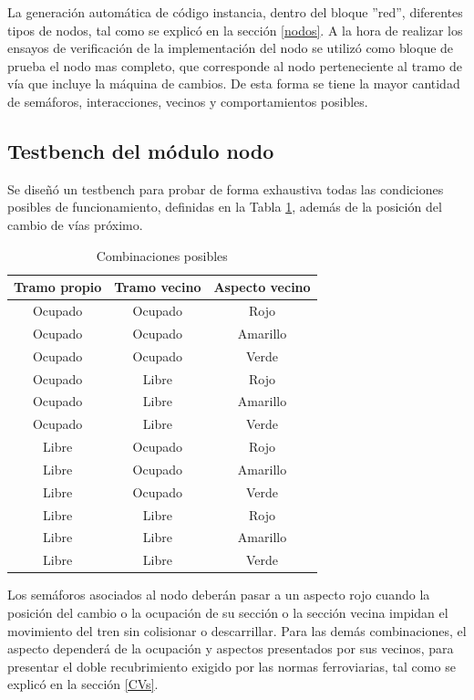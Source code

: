 	La generación automática de código instancia, dentro del bloque ''red'', diferentes tipos de nodos, tal como se explicó en la sección \ref{nodos}. A la hora de realizar los ensayos de verificación de la implementación del nodo se utilizó como bloque de prueba el nodo mas completo, que corresponde al nodo perteneciente al tramo de vía que incluye la máquina de cambios. De esta forma se tiene la mayor cantidad de semáforos, interacciones, vecinos y comportamientos posibles.
	
	\subsection{Testbench del módulo nodo}
			
			Se diseñó un testbench para probar de forma exhaustiva todas las condiciones posibles de funcionamiento, definidas en la Tabla \ref{tabla_nodos}, además de la posición del cambio de vías próximo.
					
			\begin{table}[!hbt]
			\renewcommand{\arraystretch}{1.3}
			\caption{Combinaciones posibles}
			\label{tabla_nodos}
			\centering
			\begin{tabular}{ c  c  c }
			\hline
			Tramo propio & Tramo vecino & Aspecto vecino \\	
			\hline
			Ocupado & Ocupado & Rojo  \\
			Ocupado & Ocupado & Amarillo  \\
			Ocupado & Ocupado & Verde  \\	
			Ocupado & Libre & Rojo  \\
			Ocupado & Libre & Amarillo  \\
			Ocupado & Libre & Verde  \\	
			Libre & Ocupado & Rojo  \\
			Libre & Ocupado & Amarillo  \\
			Libre & Ocupado & Verde  \\	
			Libre & Libre & Rojo  \\
			Libre & Libre & Amarillo  \\
			Libre & Libre & Verde  \\	
			\end{tabular}
			\end{table}	
	
		Los semáforos asociados al nodo deberán pasar a un aspecto rojo cuando la posición del cambio o la ocupación de su sección o la sección vecina impidan el movimiento del tren sin colisionar o descarrillar. Para las demás combinaciones, el aspecto dependerá de la ocupación y aspectos presentados por sus vecinos, para presentar el doble recubrimiento exigido por las normas ferroviarias, tal como se explicó en la sección \ref{CVs}.
			
